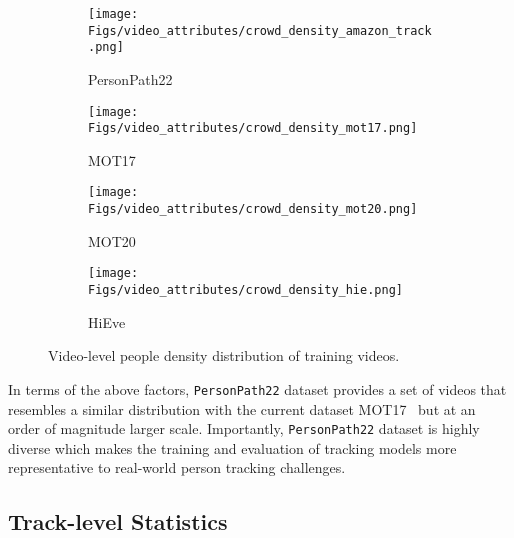 \documentclass[runningheads]{llncs}
\begin{document}
\begin{figure}[t]
    \centering
   \begin{subfigure}[b]{0.28\textwidth}
    \centering
    \texttt{[image: Figs/video\_attributes/crowd\_density\_amazon\_track.png]}
    \caption{\scriptsize PersonPath22}
    \end{subfigure}
    \begin{subfigure}[b]{0.23\textwidth}
    \centering
    \texttt{[image: Figs/video\_attributes/crowd\_density\_mot17.png]}
    \caption{\scriptsize MOT17}
    \end{subfigure}
    \begin{subfigure}[b]{0.23\textwidth}
    \centering
    \texttt{[image: Figs/video\_attributes/crowd\_density\_mot20.png]}
    \caption{\scriptsize MOT20}
    \end{subfigure}
    \begin{subfigure}[b]{0.23\textwidth}
    \centering
    \texttt{[image: Figs/video\_attributes/crowd\_density\_hie.png]}
    \caption{\scriptsize HiEve}
    \end{subfigure}
    
    \caption{\small Video-level people density distribution of training videos.}
    \label{fig:crowd_density}
\end{figure}

In terms of the above factors, \texttt{PersonPath22} dataset provides a set of videos that resembles a similar distribution with the current dataset MOT17~\cite{mot} but at an order of magnitude larger scale. Importantly, \texttt{PersonPath22} dataset is highly diverse which makes the training and evaluation of tracking models more representative to real-world person tracking challenges.

\subsection{Track-level Statistics} \label{sec:track_stat}
\end{document}
